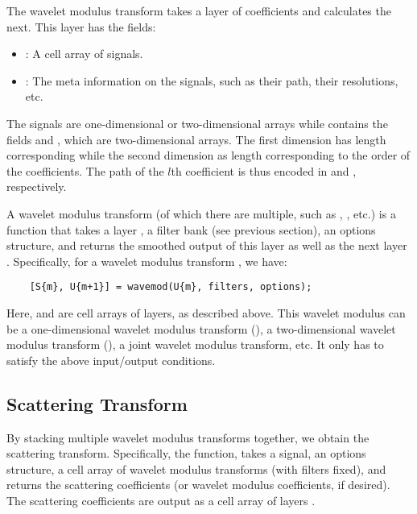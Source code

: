 \documentclass[twocolumn]{article}
\begin{document}
The wavelet modulus transform takes a layer of coefficients and calculates the next. This layer has the fields:
\begin{itemize}
	\item {}: A cell array of signals.
	\item {}: The meta information on the signals, such as their path, their resolutions, etc.
\end{itemize}
The signals are one-dimensional or two-dimensional arrays while  contains the fields  and , which are two-dimensional arrays. The first dimension has length corresponding  while the second dimension as length corresponding to the order of the coefficients. The path of the $l$th coefficient is thus encoded in  and , respectively.

A wavelet modulus transform (of which there are multiple, such as , , etc.) is a function that takes a layer , a filter bank (see previous section), an options structure, and returns  the smoothed output of this layer  as well as the next layer . Specifically, for a wavelet modulus transform , we have:
\begin{lstlisting}
	[S{m}, U{m+1}] = wavemod(U{m}, filters, options);
\end{lstlisting}
Here,  and  are cell arrays of layers, as described above. This wavelet modulus can be a one-dimensional wavelet modulus transform (), a two-dimensional wavelet modulus transform (), a joint wavelet modulus transform, etc. It only has to satisfy the above input/output conditions.

\subsection{Scattering Transform}

By stacking multiple wavelet modulus transforms together, we obtain the scattering transform. Specifically, the  function, takes a signal, an options structure, a cell array of wavelet modulus transforms (with filters fixed), and returns the scattering coefficients (or wavelet modulus coefficients, if desired). The scattering coefficients are output as a cell array of layers .
\end{document}
